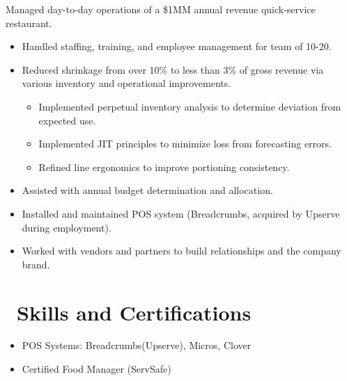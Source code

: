 \documentclass{resume}
\begin{document}
Managed day-to-day operations of a \$1MM annual revenue quick-service restaurant.
\begin{itemize}
  \item Handled staffing, training, and employee management for team of 10-20.
  \item Reduced shrinkage from over 10\% to less than 3\% of gross revenue via various inventory and operational improvements.
  \begin{itemize}
    \item Implemented perpetual inventory analysis to determine deviation from expected use.
    \item Implemented JIT principles to minimize loss from forecasting errors.
    \item Refined line ergonomics to improve portioning consistency.
  \end{itemize}
  \item Assisted with annual budget determination and allocation.
  \item Installed and maintained POS system (Breadcrumbs, acquired by Upserve during employment).
  \item Worked with vendors and partners to build relationships and the company brand.
\end{itemize}



\section{\faCogs\ Skills and Certifications}
\begin{itemize}[parsep=0.5ex]
  \item POS Systems: Breadcrumbs(Upserve), Micros, Clover
  \item Certified Food Manager (ServSafe)
\end{itemize}


%
%
\end{document}
